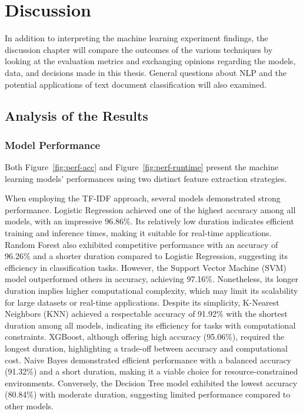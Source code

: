 \chapter{Discussion}

In addition to interpreting the machine learning experiment findings, the discussion chapter will compare the outcomes of the various techniques by looking at the evaluation metrics and exchanging opinions regarding the models, data, and decisions made in this thesis. General questions about NLP and the potential applications of text document classification will also examined.

\section{Analysis of the Results}

\subsection{Model Performance}

Both Figure~\ref{fig:perf-acc} and Figure~\ref{fig:perf-runtime} present the machine learning models' performances using two distinct feature extraction strategies.

When employing the TF-IDF approach, several models demonstrated strong performance. Logistic Regression achieved one of the highest accuracy among all models, with an impressive 96.86\%. Its relatively low duration indicates efficient training and inference times, making it suitable for real-time applications. Random Forest also exhibited competitive performance with an accuracy of 96.26\% and a shorter duration compared to Logistic Regression, suggesting its efficiency in classification tasks. However, the Support Vector Machine (SVM) model outperformed others in accuracy, achieving 97.16\%. Nonetheless, its longer duration implies higher computational complexity, which may limit its scalability for large datasets or real-time applications. Despite its simplicity, K-Nearest Neighbors (KNN) achieved a respectable accuracy of 91.92\% with the shortest duration among all models, indicating its efficiency for tasks with computational constraints. XGBoost, although offering high accuracy (95.06\%), required the longest duration, highlighting a trade-off between accuracy and computational cost. Naive Bayes demonstrated efficient performance with a balanced accuracy (91.32\%) and a short duration, making it a viable choice for resource-constrained environments. Conversely, the Decision Tree model exhibited the lowest accuracy (80.84\%) with moderate duration, suggesting limited performance compared to other models.


